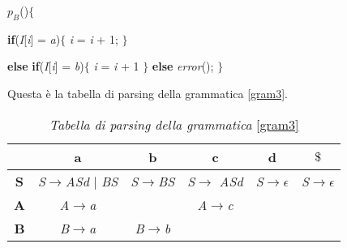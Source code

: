 $p_B$()$\{$ \par \hspace{0.5cm}\textbf{if}(\textit{I}[\textit{i}] = \textit{a})$\{$ \textit{i} = \textit{i} + 1; $\}$\par \hspace{0.5cm}\textbf{else} \textbf{if}(\textit{I}[\textit{i}] = \textit{b})$\{$ \textit{i} = \textit{i} + 1 $\}$ \textbf{else} \textit{error}(); $\}$\par
\vspace{0.3cm}
Questa è la tabella di parsing della grammatica \ref{gram3}.
\begin{table}[hbpb]
	\centering
	\label{tabellaparsingNLL1}
	\begin{tabular}{cccccc} 
		\toprule
		& \textbf{a} & \textbf{b} & \textbf{c} & \textbf{d} &\textbf{$\$$} \\ 
		\midrule
		\textbf{S} 	& \textit{S}$\to$\textit{ASd} $\mid$ \textit{BS} & \textit{S}$\to$\textit{BS}&\textit{S}$\to$ \textit{ASd}&\textit{S}$\to$$\epsilon$& \textit{S}$\to$$\epsilon$\\ 
		\textbf{A} & \textit{A}$\to$\textit{a}&  & \textit{A}$\to$\textit{c}\\ 
		\textbf{B} & \textit{B}$\to$\textit{a} & \textit{B}$\to$\textit{b}&   \\ 
		\bottomrule
	\end{tabular}
	\caption{\textit{Tabella di parsing della grammatica }\ref{gram3}}
\end{table} \par
